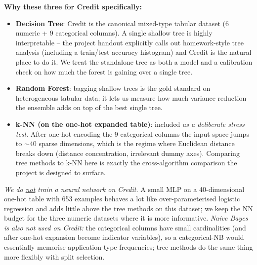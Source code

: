 \documentclass[11pt]{article}
\begin{document}
\textbf{Why these three for Credit specifically:}
\begin{itemize}
  \item \textbf{Decision Tree}: Credit is the canonical mixed-type tabular dataset (6 numeric + 9 categorical columns). A single shallow tree is highly interpretable -- the project handout explicitly calls out homework-style tree analysis (including a train/test accuracy histogram) and Credit is the natural place to do it. We treat the standalone tree as both a model and a calibration check on how much the forest is gaining over a single tree.
  \item \textbf{Random Forest}: bagging shallow trees is the gold standard on heterogeneous tabular data; it lets us measure how much variance reduction the ensemble adds on top of the best single tree.
  \item \textbf{k-NN (on the one-hot expanded table)}: included \emph{as a deliberate stress test}. After one-hot encoding the 9 categorical columns the input space jumps to $\sim 40$ sparse dimensions, which is the regime where Euclidean distance breaks down (distance concentration, irrelevant dummy axes). Comparing tree methods to k-NN here is exactly the cross-algorithm comparison the project is designed to surface.
\end{itemize}
\emph{We do \underline{not} train a neural network on Credit.} A small MLP on a 40-dimensional one-hot table with 653 examples behaves a lot like over-parameterised logistic regression and adds little above the tree methods on this dataset; we keep the NN budget for the three numeric datasets where it is more informative. \emph{Naive Bayes is also not used on Credit:} the categorical columns have small cardinalities (and after one-hot expansion become indicator variables), so a categorical-NB would essentially memorise application-type frequencies; tree methods do the same thing more flexibly with split selection.
\end{document}
